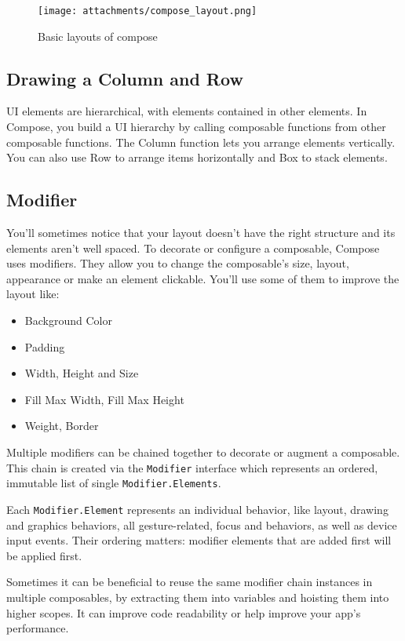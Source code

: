 \documentclass[12pt,oneside]{book}
\begin{document}
\begin{figure}
  \centering
  \texttt{[image: attachments/compose\_layout.png]}
  \caption{Basic layouts of compose}
\end{figure}

\subsection{Drawing a Column and Row}
UI elements are hierarchical, with elements contained in other elements. In Compose, you build a UI hierarchy by calling composable functions from other composable functions. The Column function lets you arrange elements vertically. You can also use Row to arrange items horizontally and Box to stack elements.

\subsection{Modifier}
You'll sometimes notice that your layout doesn't have the right structure and its elements aren't well spaced. To decorate or configure a composable, Compose uses modifiers. They allow you to change the composable's size, layout, appearance or make an element clickable. You'll use some of them to improve the layout like:
\begin{itemize}
  \item Background Color
  \item Padding
  \item Width, Height and Size
  \item Fill Max Width, Fill Max Height
  \item Weight, Border
\end{itemize}
Multiple modifiers can be chained together to decorate or augment a composable. This chain is created via the \texttt{Modifier} interface which represents an ordered, immutable list of single \texttt{Modifier.Elements}.

Each \texttt{Modifier.Element} represents an individual behavior, like layout, drawing and graphics behaviors, all gesture-related, focus and behaviors, as well as device input events. Their ordering matters: modifier elements that are added first will be applied first.

Sometimes it can be beneficial to reuse the same modifier chain instances in multiple composables, by extracting them into variables and hoisting them into higher scopes. It can improve code readability or help improve your app's performance.
\end{document}

